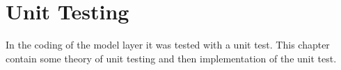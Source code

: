 \chapter{Unit Testing}
In the coding of the model layer it was tested with a unit test. This chapter contain some theory of unit testing and then implementation of the unit test.